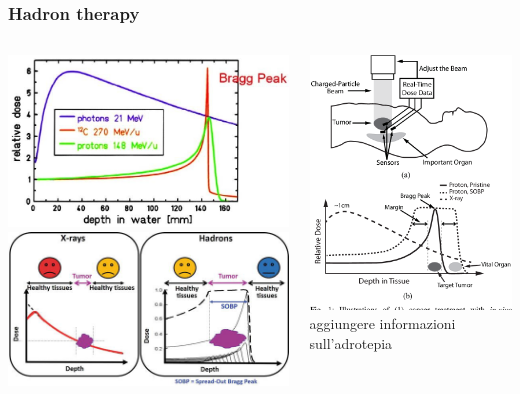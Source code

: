\documentclass[aspectratio=169]{beamer}
\begin{document}
	\begin{frame}
	\frametitle{Hadron therapy}
	\begin{columns}
		\begin{center}
			\includegraphics[width=0.75 \textwidth]{IMG/Bragg_Peak.PNG}
			\includegraphics[width=0.65 \textwidth]{IMG/Bragg_Peak2.PNG}
		\end{center}
		\begin{center}
			\includegraphics[width=0.55 \textwidth]{IMG/HadroTherapy.PNG}
			\newline
			{\color{red} aggiungere informazioni sull'adrotepia}
		\end{center}
	\end{columns}
	
	\end{frame}
\end{document}
